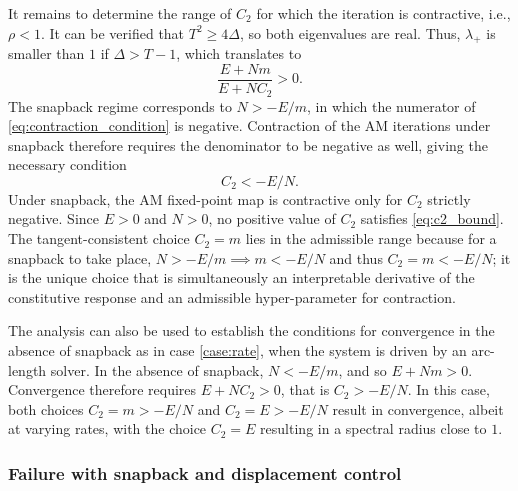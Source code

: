 \documentclass[10pt]{cas-sc}
\newcommand{\deleted}[1]{}
\newcommand{\added}[1]{#1}
\begin{document}
\added{It remains to determine the range of $C_2$ for which the iteration is contractive, i.e., $\rho < 1$.} \deleted{In a general case, i}\added{I}t can be verified that $T^2 \geq 4\Delta$\added{, so both eigenvalues are real}. Thus, $\lambda_+$ is smaller than $1$ if $\Delta > T-1$, which translates to \deleted{This translates to}
\begin{equation}
	\frac{E+Nm}{E+NC_2} >0. \label{eq:contraction_condition}
\end{equation}
\added{The snapback regime corresponds to $N>-E/m$, in which the numerator of \eqref{eq:contraction_condition} is negative. Contraction of the AM iterations under snapback therefore requires the denominator to be negative as well, giving the necessary condition}\deleted{When $N>-E/m$, a snapback takes place. Then, for convergence, the above relation requires}
\begin{equation}
	C_2<-E/N. \label{eq:c2_bound}
\end{equation}
\added{Under snapback, the AM fixed-point map is contractive only for $C_2$ strictly negative. Since $E>0$ and $N>0$, no positive value of $C_2$ satisfies \eqref{eq:c2_bound}. The tangent-consistent choice $C_2=m$ lies in the admissible range because for a snapback to take place, $N>-E/m \implies m<-E/N$ and thus $C_2=m<-E/N$; it is the unique choice that is simultaneously an interpretable derivative of the constitutive response and an admissible hyper-parameter for contraction. }\deleted{Since $E >0,N>0$, any positive $C_2$ will result in a spectral radius larger than $1$.}

\added{The analysis can also be used to establish the conditions for convergence in the absence of snapback as in case \ref{case:rate}, when the system is driven by an arc-length solver. In the absence of snapback, $N< -E/m$, and so $E+Nm>0$. Convergence therefore requires $E+NC_2>0$, that is $C_2 > -E/N$. In this case, both choices $C_2=m >-E/N$ and $C_2=E >-E/N$ result in convergence, albeit at varying rates, with the choice $C_2=E$ resulting in a spectral radius close to $1$.}


\subsubsection*{Failure with snapback and displacement control}
\end{document}
